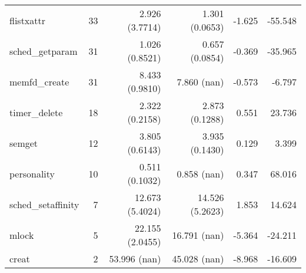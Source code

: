 \begin{longtable}{>{\ttfamily}lrrrrr}
                     flistxattr &         33 &           2.926 (3.7714) &           1.301 (0.0653) &          -1.625 &      -55.548 \\
                sched\_getparam &         31 &           1.026 (0.8521) &           0.657 (0.0854) &          -0.369 &      -35.965 \\
                  memfd\_create &         31 &           8.433 (0.9810) &              7.860 (nan) &          -0.573 &       -6.797 \\
                  timer\_delete &         18 &           2.322 (0.2158) &           2.873 (0.1288) &           0.551 &       23.736 \\
                         semget &         12 &           3.805 (0.6143) &           3.935 (0.1430) &           0.129 &        3.399 \\
                    personality &         10 &           0.511 (0.1032) &              0.858 (nan) &           0.347 &       68.016 \\
             sched\_setaffinity &          7 &          12.673 (5.4024) &          14.526 (5.2623) &           1.853 &       14.624 \\
                          mlock &          5 &          22.155 (2.0455) &             16.791 (nan) &          -5.364 &      -24.211 \\
                          creat &          2 &             53.996 (nan) &             45.028 (nan) &          -8.968 &      -16.609 \\
\end{longtable}
